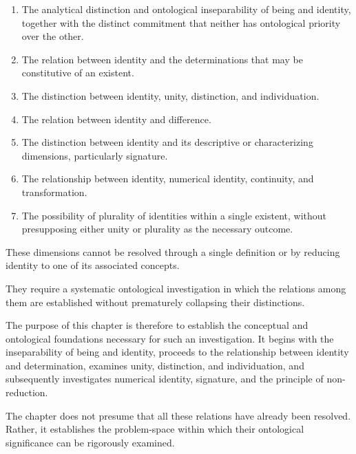 \begin{enumerate}
    \item The analytical distinction and
    ontological inseparability of being
    and identity, together with the distinct
    commitment that neither has ontological
    priority over the other.

    \item The relation between identity
    and the determinations that may be
    constitutive of an existent.

    \item The distinction between identity,
    unity, distinction, and individuation.

    \item The relation between identity
    and difference.

    \item The distinction between identity
    and its descriptive or characterizing
    dimensions, particularly signature.

    \item The relationship between identity,
    numerical identity, continuity, and
    transformation.

    \item The possibility of plurality
    of identities within a single existent,
    without presupposing either unity or
    plurality as the necessary outcome.
\end{enumerate}

These dimensions cannot be resolved through
a single definition or by reducing identity
to one of its associated concepts.

They require a systematic ontological
investigation in which the relations among
them are established without prematurely
collapsing their distinctions.

The purpose of this chapter is therefore
to establish the conceptual and ontological
foundations necessary for such an investigation.
It begins with the inseparability of being
and identity, proceeds to the relationship
between identity and determination, examines
unity, distinction, and individuation, and
subsequently investigates numerical identity,
signature, and the principle of non-reduction.

The chapter does not presume that all these
relations have already been resolved. Rather,
it establishes the problem-space within which
their ontological significance can be
rigorously examined.




